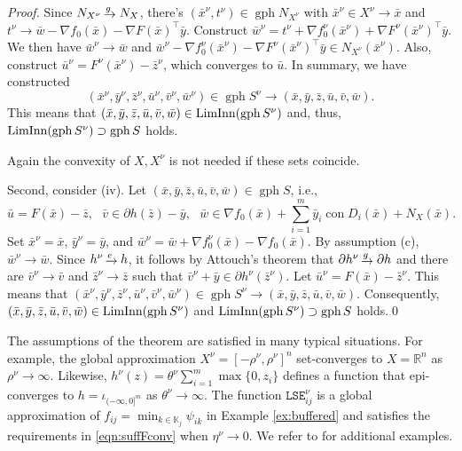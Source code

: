 \documentclass[smallextended,envcountsect]{svjour3}
\newcommand{\reals}{\mathbb{R}}
\newcommand{\nInnLim}{\mathop{\rm LimInn}\nolimits}
\DeclareMathOperator{\con}{con}
\DeclareMathOperator{\gph}{gph}
\newcommand{\eto}{\,{\lower 1pt\hbox{$\rightarrow$}}\kern -10pt
     \hbox{\raise 4pt \hbox{$\, \scriptstyle e$}}\hskip7pt}
\newcommand{\gto}{\,{\lower 1pt\hbox{$\rightarrow$}}\kern -10pt
     \hbox{\raise 4.5pt \hbox{$\, \scriptstyle g$}}\hskip7pt}
\begin{document}
\begin{proof}
Since $N_{X^\nu} \gto N_X$, there's $(\bar x^\nu,t^\nu) \in \gph N_{X^\nu}$ with $\bar x^\nu \in X^\nu \to \bar x$ and $t^\nu \to \bar w - \nabla f_0(\bar x) - \nabla F(\bar x)^\top \bar y$. Construct $\bar w^\nu = t^\nu +  \nabla f_0^\nu(\bar x^\nu) + \nabla F^\nu(\bar x^\nu)^\top \bar y$. We then have $\bar w^\nu \to \bar w$ and $\bar w^\nu - \nabla f_0^\nu(\bar x^\nu) - \nabla F^\nu(\bar x^\nu)^\top \bar y \in N_{X^\nu}(\bar x^\nu)$. Also, construct $\bar u^\nu = F^\nu(\bar x^\nu) - \bar z^\nu$, which converges to $\bar u$.
In summary, we have constructed 
\[
(\bar x^\nu, \bar y^\nu, \bar z^\nu, \bar u^\nu, \bar v^\nu, \bar w^\nu) \in \gph S^\nu \to (\bar x, \bar y, \bar z, \bar u, \bar v, \bar w).
\]
This means that $(\bar x, \bar y, \bar z, \bar u, \bar v, \bar w) \in \nInnLim (\gph S^\nu)$ and, thus, $\nInnLim (\gph S^\nu) \supset \gph S$ holds.

Again the convexity of $X,X^\nu$ is not needed if these sets coincide. 

Second, consider (iv). Let $(\bar x, \bar y, \bar z, \bar u,
\bar v, \bar w) \in \gph S$, i.e., 
\[
\bar u = F(\bar x) - \bar z, ~~~ \bar v \in \partial h(\bar z)- \bar y, ~~~ \bar w \in \nabla f_0(\bar x) + \sum_{i=1}^m \bar y_i \con D_i(\bar x) + N_{X}(\bar x).
\]
Set $\bar x^\nu = \bar x$, $\bar y^\nu = \bar y$, and $\bar w^\nu = \bar w + \nabla f_0^\nu(\bar x) - \nabla f_0(\bar x)$. By assumption (c), $\bar w^\nu\to \bar w$. Since $h^\nu\eto h$, it follows by Attouch's theorem that $\partial h^\nu \gto \partial h$ and there are $\bar v^\nu \to \bar v$ and $\bar z^\nu\to \bar z$ such that $\bar v^\nu + \bar y \in \partial h^\nu(\bar z^\nu)$. Let $\bar u^\nu = F(\bar x) - \bar z^\nu$. This means that $(\bar x^\nu, \bar y^\nu, \bar z^\nu, \bar u^\nu, \bar v^\nu, \bar w^\nu) \in \gph S^\nu \to (\bar x, \bar y, \bar z, \bar u, \bar v, \bar w)$. Consequently, $(\bar x, \bar y, \bar z, \bar u, \bar v, \bar w) \in \nInnLim (\gph S^\nu)$ and $\nInnLim (\gph S^\nu) \supset \gph S$ holds.\qed
\end{proof}


The assumptions of the theorem are satisfied in many typical situations. For example, the global approximation $X^\nu = [-\rho^\nu,\rho^\nu]^n$ set-converges to $X = \reals^n$ as $\rho^\nu\to \infty$. Likewise, $h^\nu(z) = \theta^\nu\sum_{i=1}^m \max\{0,z_i\}$ defines a function that epi-converges to $h = \iota_{(-\infty,0]^m}$ as $\theta^\nu\to \infty$. The function $\mathtt{LSE}^\nu_{ij}$ is a global approximation of $f_{ij} = \min_{k\in \mathbb{K}_j} \psi_{ik}$ in Example \ref{ex:buffered} and satisfies the requirements in \eqref{eqn:suffFconv} when $\eta^\nu\to 0$. We refer to \cite{Royset2023a} for additional examples. 
\end{document}
